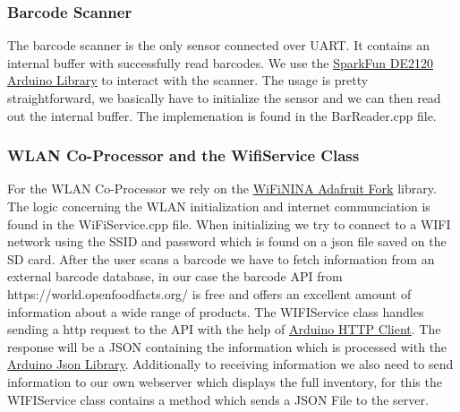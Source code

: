 \documentclass{article}
\begin{document}
\subsubsection{Barcode Scanner}
The barcode scanner is the only sensor connected over UART. It contains an internal buffer with successfully read barcodes.
We use the \href{https://github.com/sparkfun/SparkFun_DE2120_Arduino_Library}{SparkFun DE2120 Arduino Library} to interact with the scanner.
The usage is pretty straightforward, we basically have to initialize the sensor and we can then read out the internal buffer.
The implemenation is found in the BarReader.cpp file.
\subsubsection{WLAN Co-Processor and the WifiService Class}
For the WLAN Co-Processor we rely on the \href{https://github.com/adafruit/WiFiNINA}{WiFiNINA Adafruit Fork} library.
The logic concerning the WLAN initialization and internet communciation is found in the WiFiService.cpp file.
When initializing we try to connect to a WIFI network using the SSID and password which is found on a json file saved on the SD card.
After the user scans a barcode we have to fetch information from an external barcode database, in our case the barcode API from https://world.openfoodfacts.org/ is free and offers an excellent amount of information about a wide range of products.
The WIFIService class handles sending a http request to the API with the help of \href{https://github.com/arduino-libraries/ArduinoHttpClient}{Arduino HTTP Client}.
The response will be a JSON containing the information which is processed with the \href{https://github.com/bblanchon/ArduinoJson}{Arduino Json Library}.
Additionally to receiving information we also need to send information to our own webserver which displays the full inventory, for this the WIFIService class contains a method which sends a JSON File to the server. 
\end{document}
